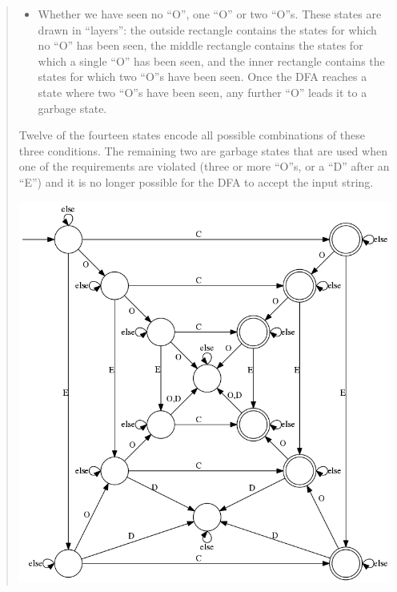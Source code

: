 \begin{quote}
\begin{itemize}
  \item Whether we have seen no ``O'', one  ``O'' or two ``O''s. These states are drawn in
    ``layers'': the  outside rectangle  contains the  states for which  no ``O''  has been
    seen, the middle rectangle contains the states for which a single ``O'' has been seen,
    and the inner rectangle contains the states  for which two ``O''s have been seen. Once
    the DFA reaches a state where two ``O''s have been seen, any further ``O'' leads it to
    a garbage state.
  \end{itemize}
  Twelve  of  the  fourteen  states  encode  all  possible  combinations  of  these  three
  conditions.  The  remaining two  are  garbage  states that  are  used  when one  of  the
  requirements are violated (three or more ``O''s, or a ``D'' after an ``E'') and it is no
  longer possible for the DFA to accept the input string.
  \begin{center}
    \leavevmode\includegraphics[width=5in]{images/dfa-CODE.png}
  \end{center}
\end{quote}
